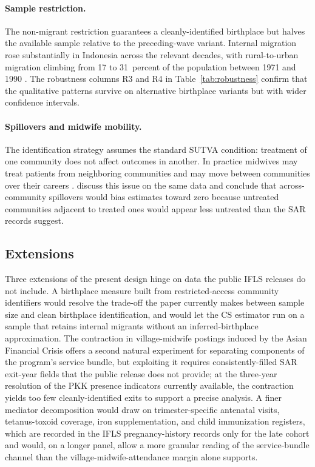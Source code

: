 \paragraph{Sample restriction.} The non-migrant restriction guarantees a cleanly-identified birthplace but halves the available sample relative to the preceding-wave variant. Internal migration rose substantially in Indonesia across the relevant decades, with rural-to-urban migration climbing from 17 to 31~percent of the population between 1971 and 1990 \autocite{alatas1993}. The robustness columns R3 and R4 in Table~\ref{tab:robustness} confirm that the qualitative patterns survive on alternative birthplace variants but with wider confidence intervals.

\paragraph{Spillovers and midwife mobility.} The identification strategy assumes the standard SUTVA condition: treatment of one community does not affect outcomes in another. In practice midwives may treat patients from neighboring communities and may move between communities over their careers \autocite{jointcommittee2013}. \textcite{ahsan2021} discuss this issue on the same data and conclude that across-community spillovers would bias estimates toward zero because untreated communities adjacent to treated ones would appear less untreated than the SAR records suggest.

\subsection{Extensions}

Three extensions of the present design hinge on data the public IFLS releases do not include. A birthplace measure built from restricted-access community identifiers would resolve the trade-off the paper currently makes between sample size and clean birthplace identification, and would let the CS estimator run on a sample that retains internal migrants without an inferred-birthplace approximation. The contraction in village-midwife postings induced by the Asian Financial Crisis offers a second natural experiment for separating components of the program's service bundle, but exploiting it requires consistently-filled SAR exit-year fields that the public release does not provide; at the three-year resolution of the PKK presence indicators currently available, the contraction yields too few cleanly-identified exits to support a precise analysis. A finer mediator decomposition would draw on trimester-specific antenatal visits, tetanus-toxoid coverage, iron supplementation, and child immunization registers, which are recorded in the IFLS pregnancy-history records only for the late cohort and would, on a longer panel, allow a more granular reading of the service-bundle channel than the village-midwife-attendance margin alone supports.
